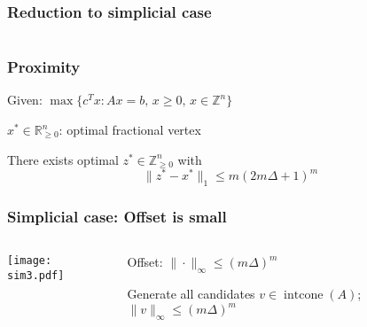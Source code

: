 \documentclass[aspectratio=169,xcolor=dvipsnames,noframenumbering]{beamer}
\newcommand\tabb{\hspace{.75cm}}
\newcommand{\intcone}{\operatorname{intcone}}
\renewcommand\geq{\geqslant}
\begin{document}
\begin{frame}[t]
  \frametitle{Reduction to simplicial case}


  \begin{columns}
    \begin{column}{.6\textwidth}
      
    \end{column}
    \begin{column}{.4\textwidth}
    \end{column}
\end{columns}
\end{frame}


\begin{frame}[t] 
  \frametitle{Proximity}
  \begin{theorem}[E. \& Weismantel (2019)]
  \label{thm:prox}
Given: 
$
\label{eq:ProximityIP}
  \max \big\{ c^T x : Ax = b, \, x ≥ {0}, \, x ∈ ℤ^n \big\}  
$

\medskip 
\tabb $x^*∈ℝ^n_{\geq 0}$:  optimal fractional vertex

\medskip 
There exists optimal $z^*∈ℤ^n_{\geq 0}$ with
\begin{displaymath}
  \|z^* - x^* \|_1 \leq m(2m \Delta + 1)^m 
\end{displaymath}
\end{theorem}
\end{frame}

\begin{frame}[t]
  \frametitle{Simplicial case: Offset is small }


  \begin{columns}
    \begin{column}{.6\textwidth}
             \texttt{[image: sim3.pdf]}     
    \end{column}
    \begin{column}{.4\textwidth}
      Offset: $\| ⋅\|_∞ ≤ (mΔ)^m$

      \bigskip

      Generate all candidates $v ∈ \intcone(A)$; $\|v\|_∞ ≤(mΔ)^m$  
    \end{column}
\end{columns}
\end{frame}
\end{document}
